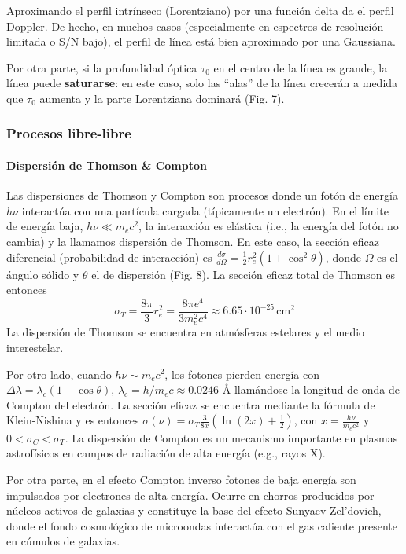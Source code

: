 \documentclass[11pt,letterpaper]{article}
\begin{document}
Aproximando el perfil intrínseco (Lorentziano) por una función delta da el perfil Doppler. De hecho, en muchos casos (especialmente en espectros de resolución limitada o S/N bajo), el perfil de línea está bien aproximado por una Gaussiana.

Por otra parte, si la profundidad óptica \(\tau_0\) en el centro de la línea es grande, la línea puede \textbf{saturarse}: en este caso, solo las ``alas'' de la línea crecerán a medida que \(\tau_0\) aumenta y la parte Lorentziana dominará (Fig. 7).

\subsubsection{Procesos libre-libre}

\paragraph{Dispersión de Thomson \& Compton}
Las dispersiones de Thomson y Compton son procesos donde un fotón de energía \(h\nu\) interactúa con una partícula cargada (típicamente un electrón). En el límite de energía baja, \(h\nu \ll m_e c^2\), la interacción es elástica (i.e., la energía del fotón no cambia) y la llamamos dispersión de Thomson. En este caso, la sección eficaz diferencial (probabilidad de interacción) es \(\frac{d\sigma}{d\Omega} = \frac{1}{2} r_e^2 (1 + \cos^2 \theta)\), donde \(\Omega\) es el ángulo sólido y \(\theta\) el de dispersión (Fig. 8). La sección eficaz total de Thomson es entonces
\begin{equation}
    \sigma_T = \frac{8\pi}{3} r_e^2 = \frac{8\pi e^4}{3 m_e^2 c^4} \approx 6.65 \cdot 10^{-25} \, \text{cm}^2
\end{equation}
La dispersión de Thomson se encuentra en atmósferas estelares y el medio interestelar.

Por otro lado, cuando \(h\nu \sim m_e c^2\), los fotones pierden energía con \(\Delta \lambda = \lambda_c (1 - \cos \theta)\), \(\lambda_c = h/m_e c \approx 0.0246\) \AA{} llamándose la longitud de onda de Compton del electrón. La sección eficaz se encuentra mediante la fórmula de Klein-Nishina y es entonces \(\sigma(\nu) = \sigma_T \frac{3}{8x} (\ln(2x) + \frac{1}{2})\), con \(x = \frac{h\nu}{m_e c^2}\) y \(0 < \sigma_C < \sigma_T\). La dispersión de Compton es un mecanismo importante en plasmas astrofísicos en campos de radiación de alta energía (e.g., rayos X).

Por otra parte, en el efecto Compton inverso fotones de baja energía son impulsados por electrones de alta energía. Ocurre en chorros producidos por núcleos activos de galaxias y constituye la base del efecto Sunyaev-Zel'dovich, donde el fondo cosmológico de microondas interactúa con el gas caliente presente en cúmulos de galaxias.
\end{document}
